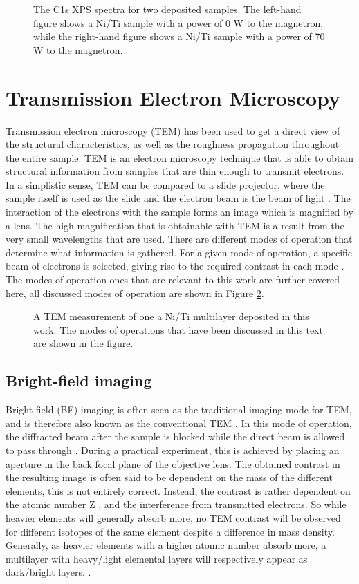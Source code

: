 \begin{figure}
	\centering
	\def\svgwidth{\textwidth}
	
	\caption{The C1s XPS spectra for two deposited samples. The left-hand figure shows a Ni/Ti sample with a power of 0 W to the  \natBC  magnetron, while the right-hand figure shows a Ni/Ti sample with a power of 70 W to the \natBC magnetron.}
	\label{XPS}
\end{figure}
\section{Transmission Electron Microscopy}\label{TEM}
Transmission electron microscopy (TEM) has been used to get a direct view of the structural characteristics, as well as the roughness propagation throughout the entire sample. TEM is an electron microscopy technique that is able to obtain structural information from samples that are thin enough to transmit electrons. In a simplistic sense, TEM can be compared to a slide projector, where the sample itself is used as the slide and the electron beam is the beam of light \cite{ohring}. The interaction of the electrons with the sample forms an image which is magnified by a lens. The high magnification that is obtainable with TEM is a result from the very small wavelengths that are used. There are different modes of operation that determine what information is gathered. For a given mode of operation, a specific beam of electrons is selected, giving rise to the required contrast in each mode \cite{TEM_new}. The modes of operation ones that are relevant to this work are further covered here, all discussed modes of operation are shown in Figure \ref{TEMfig}.
\begin{figure}[h]
	\centering
	\def\svgwidth{\textwidth}
	
	\caption{A TEM measurement of one a Ni/Ti multilayer deposited in this work. The modes of operations that have been discussed in this text are shown in the figure.}
\label{TEMfig}
\end{figure}
\subsection{Bright-field imaging}
Bright-field (BF) imaging is often seen as the traditional imaging mode for TEM, and is therefore also known as the conventional TEM \cite{ohring}. In this mode of operation, the diffracted beam after the sample is blocked while the direct beam is allowed to pass through \cite{TEM_new}. During a practical experiment, this is achieved by placing an aperture in the back focal plane of the objective lens. The obtained contrast in the resulting image is often said to be dependent on the mass of the different elements, this is not entirely correct. Instead, the contrast is rather dependent on the atomic number Z \cite{spence2013high}, and the interference from transmitted electrons. So while heavier elements will generally absorb more, no TEM contrast will be observed for different isotopes of the same element despite a difference in mass density. Generally, as heavier elements with a higher atomic number absorb more, a multilayer with heavy/light elemental layers will respectively appear as dark/bright layers. \cite{thesis_naureen}. 
